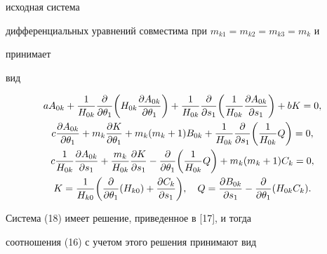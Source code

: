 исходная система  


дифференциальных уравнений совместима при $m_{k1}=m_{k2}=m_{k3}=m_k$ и 


принимает  


вид 


\begin{gather} 


aA_{0k}+\frac{1}{H_{0k}}\frac{\partial }{\partial \theta_1} 


\bigg(H_{0k}\frac{\partial A_{0k}}{\partial \theta_1} \bigg) 


+\frac{1}{H_{0k}}\frac{\partial }{\partial s_1} 


\bigg(\frac{1}{H_{0k}}\frac{\partial A_{0k}}{\partial s_1} \bigg) 


+bK=0,\notag \\ 


% 


c\frac{\partial A_{0k}}{\partial \theta_1}+m_k 


\frac{\partial K}{\partial \theta_1}+m_k(m_k+1)B_{0k} 


+\frac{1}{H_{0k}}\frac{\partial }{\partial s_1} 


\bigg(\frac{1}{H_{0k}}Q \bigg)=0,\notag\\ 


% 


c\frac{1}{H_{0k}}\frac{\partial A_{0k}}{\partial s_1} 


+\frac{m_k}{H_{0k}}\frac{\partial K}{\partial s_1} 


-\frac{\partial }{\partial \theta_1} 


\bigg(\frac{1}{H_{0k}}Q \bigg)+m_k(m_k+1)C_k=0,\\ 


% 


K=\frac{1}{H_{k0}}\bigg(\frac{\partial }{\partial \theta_1} 


(H_{k0})+\frac{\partial C_k}{\partial s_1}\bigg),\quad 


Q=\frac{\partial B_{0k}}{\partial s_1}- 


\frac{\partial }{\partial \theta_1}(H_{0k}C_k).\notag 


\end{gather} 


 


Система (18) имеет решение, приведенное в [17], и тогда  


соотношения (16) с учетом этого решения принимают вид 


